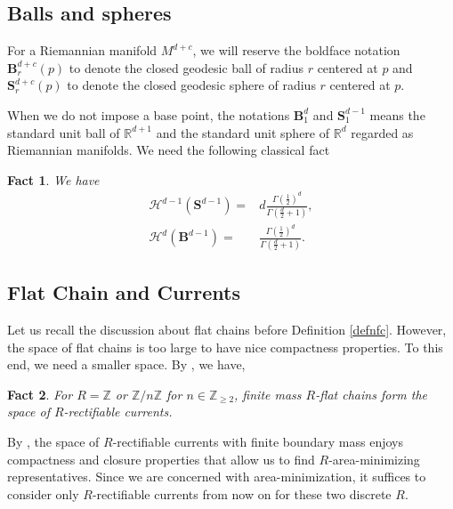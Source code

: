 \documentclass[11pt,a4paper]{amsart}
\numberwithin{equation}{section}
\newcommand{\Ga}{\Gamma}
\newcommand{\R}{\mathbb{R}}
\newcommand{\Z}{\mathbb{Z}}
\theoremstyle{plain}
\newtheorem{fact}{Fact}[subsection]
\theoremstyle{definition}
\numberwithin{equation}{subsection}
\begin{document}
\subsection{Balls and spheres}
For a Riemannian manifold $M^{d+c}$, we will reserve the boldface notation $\mathbf{B}^{d+c}_r(p)$ to denote the closed geodesic ball of radius $r$ centered at $p$  and $\mathbf{S}^{d+c}_r(p)$ to denote the closed geodesic sphere of radius $r$ centered at $p$.

When we do not impose a base point, the notations $\mathbf{B}^d_1$ and $\mathbf{S}^{d-1}_1$ means the standard unit ball of $\R^{d+1}$ and the standard unit sphere of $\R^{d}$ regarded as Riemannian manifolds. We need the following classical fact \cite[p.208 Exercise 4]{SSfourier}
\begin{fact}\label{fctvols}
	We have
	\begin{align*}
		\mathcal{H}^{d-1}(\mathbf{S}^{d-1})=&d\frac{\Ga\left(\frac{1}{2}\right)^d}{\Ga\left(\frac{d}{2}+1\right)},\\
		\mathcal{H}^{d}(\mathbf{B}^{d-1})=&\frac{\Ga\left(\frac{1}{2}\right)^d}{\Ga\left(\frac{d}{2}+1\right)}.
	\end{align*}
\end{fact}
	\subsection{Flat Chain and Currents}
	Let us recall the discussion about flat chains before Definition \ref{defnfc}. However, the space of flat chains is too large to have nice compactness properties. To this end, we need a smaller space. By \cite[Sections 4.2.16 and (4.2.16)$^v$ of 4.2.26]{HF}, we have, 
	\begin{fact}\label{fctrc}
		For $R=\Z$ or $\Z/n\Z$ for $n\in\Z_{\ge 2}$, finite mass $R$-flat chains form the space of $R$-rectifiable currents. 
	\end{fact}
	By \cite[Sections 4.2.17 and (4.2.17)$^v$ of 4.2.26]{HF}, the space of $R$-rectifiable currents with finite boundary mass enjoys compactness and closure properties that allow us to find $R$-area-minimizing representatives. Since we are concerned with area-minimization, it suffices to consider only $R$-rectifiable currents from now on for these two discrete $R.$
	
\end{document}
